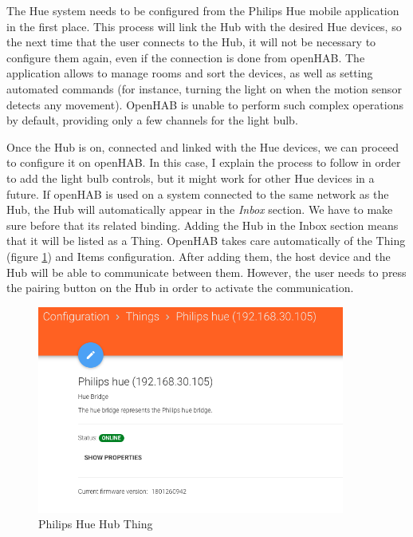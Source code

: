 The Hue system needs to be configured from the Philips Hue mobile application in the first place. This process will link the Hub with the
desired Hue devices, so the next time that the user connects to the Hub, it will not be necessary to configure them again, even if
the connection is done from openHAB. The application allows to manage rooms and sort the devices, as well as setting automated commands
(for instance, turning the light on when the motion sensor detects any movement). OpenHAB is unable to perform such complex operations
by default, providing only a few channels for the light bulb.

Once the Hub is on, connected and linked with the Hue devices, we can proceed to configure it on openHAB. In this case, I explain
the process to follow in order to add the light bulb controls, but it might work for other Hue devices in a future. If openHAB is
used on a system connected to the same network as the Hub, the Hub will automatically appear in the \textit{Inbox} section. We have
to make sure before that its related binding. Adding the Hub in the Inbox section means that it will be listed as a Thing. OpenHAB
takes care automatically of the Thing (figure \ref{fig:philips-hue-hub-thing}) and Items configuration. After adding them, the host
device and the Hub will be able to communicate between them. However, the user needs to press the pairing button on the Hub in
order to activate the communication.

\begin{figure}
    \centering
    \includegraphics[width=0.9\textwidth]{images/Chapter_06/philips-hue-hub-thing.png}
    \caption{Philips Hue Hub Thing}
    \label{fig:philips-hue-hub-thing}
\end{figure}

